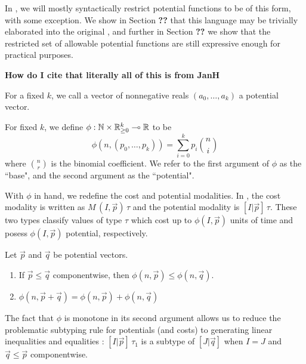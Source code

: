 In \dlambdaamor, we will mostly syntactically restrict potential functions to be of this form, with some exception. We show in Section \textbf{??} that this language may be trivially elaborated into the original \lambdaamor, and further in Section \textbf{??} we show that the restricted set of allowable potential functions are still expressive enough for practical purposes.

\textbf{How do I cite that literally all of this is from JanH}

\begin{definition}
For a fixed $k$, we call a vector of nonnegative reals $(a_0,\dots,a_k)$ a potential vector.
\end{definition}

\begin{definition}
For fixed $k$, we define $\phi : \mathbb{N} \times \mathbb{R}_{\geq 0}^k \multimap \mathbb{R}$ to be
$$
\phi\left(n,(p_0,\dots,p_k)\right) = \sum_{i=0}^k p_i\binom{n}{i}
$$
where $\binom{n}{r}$ is the binomial coefficient. We refer to the first argument of $\phi$ as the ``base", and the second argument as the ``potential".
\end{definition}

With $\phi$ in hand, we redefine the cost and potential modalities. In \dlambdaamor, the cost modality is written as $M \, (I,\vec{p}) \, \tau$ and the potential modality is $[I|\vec{p}] \,  \tau$. These two types classify values of type $\tau$ which cost up to $\phi(I,\vec{p})$ units of time and posess $\phi(I,\vec{p})$ potential, respectively.

\begin{theorem}
Let $\vec{p}$ and $\vec{q}$ be potential vectors.
\begin{enumerate}
  \item If $\vec{p} \leq \vec{q}$ componentwise, then $\phi(n,\vec{p}) \leq \phi(n,\vec{q})$.
  \item $\phi(n,\vec{p} + \vec{q}) = \phi(n,\vec{p}) + \phi(n,\vec{q})$
\end{enumerate}
\end{theorem}

The fact that $\phi$ is monotone in its second argument allows us to reduce the problematic subtyping rule for potentials (and costs) to generating linear inequalities and equalities : $[I|\vec{p}] \, \tau_1$ is a subtype of $[J|\vec{q}]$ when $I = J$ and $\vec{q} \leq \vec{p}$ componentwise.

